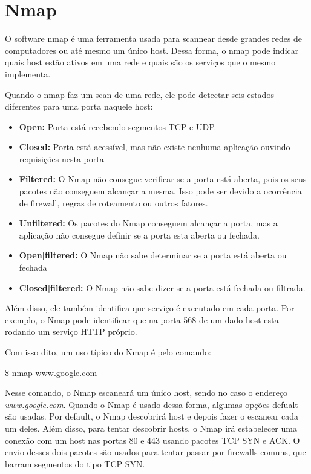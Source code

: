 \chapter{Nmap}

O software nmap é uma ferramenta usada para scannear desde grandes redes de
computadores ou até mesmo um único host. Dessa forma, o nmap pode indicar quais
host estão ativos em uma rede e quais são os serviços que o mesmo implementa.

Quando o nmap faz um scan de uma rede, ele pode detectar seis estados diferentes
para uma porta naquele host:

\begin{itemize}
    \item \textbf{Open:} Porta está recebendo segmentos TCP e UDP.
    \item \textbf{Closed:} Porta está acessível, mas não existe nenhuma
    aplicação ouvindo requisições nesta porta
    \item \textbf{Filtered:} O Nmap não consegue verificar se a porta está
    aberta, pois os seus pacotes não conseguem alcançar a mesma. Isso pode ser
    devido a ocorrência de firewall, regras de roteamento ou outros fatores.
    \item \textbf{Unfiltered:} Os pacotes do Nmap conseguem alcançar a porta,
    mas a aplicação não consegue definir se a porta esta aberta ou fechada.
    \item \textbf{Open|filtered:} O Nmap não sabe determinar se a porta está
    aberta ou fechada
    \item \textbf{Closed|filtered:} O Nmap não sabe dizer se a porta está
    fechada ou filtrada.
\end{itemize}

Além disso, ele também identifica que serviço é executado em cada porta. Por exemplo, o Nmap pode identificar
que na porta 568 de um dado host esta rodando um serviço HTTP próprio.

Com isso dito, um uso típico do Nmap é pelo comando:

\$ nmap www.google.com

Nesse comando, o Nmap escaneará um único host, sendo no caso o endereço
\textit{www.google.com}. Quando o Nmap é usado dessa forma, algumas opções
defualt são usadas. Por default, o Nmap descobrirá host e depois fazer o
escanear cada um deles. Além disso, para tentar descobrir hosts, o Nmap irá
estabelecer uma conexão com um host nas portas 80 e 443 usando pacotes TCP SYN e ACK.
O envio desses dois pacotes são usados para tentar passar por firewalls comuns, que barram
segmentos do tipo TCP SYN.

